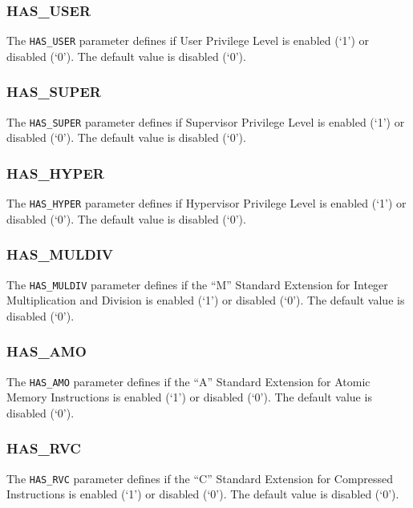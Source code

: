 \subsubsection{HAS\_USER}\label{has_user}

The \texttt{HAS\_USER} parameter defines if User Privilege Level is enabled (`1')
or disabled (`0'). The default value is disabled (`0').

\subsubsection{HAS\_SUPER}\label{has_super}

The \texttt{HAS\_SUPER} parameter defines if Supervisor Privilege Level is
enabled (`1') or disabled (`0'). The default value is disabled (`0').

\subsubsection{HAS\_HYPER}\label{has_hyper}

The \texttt{HAS\_HYPER} parameter defines if Hypervisor Privilege Level is
enabled (`1') or disabled (`0'). The default value is disabled (`0').

\subsubsection{HAS\_MULDIV}\label{has_muldiv}

The \texttt{HAS\_MULDIV} parameter defines if the ``M'' Standard Extension for
Integer Multiplication and Division is enabled (`1') or disabled (`0').
The default value is disabled (`0').

\subsubsection{HAS\_AMO}\label{has_amo}

The \texttt{HAS\_AMO} parameter defines if the ``A'' Standard Extension for
Atomic Memory Instructions is enabled (`1') or disabled (`0'). The
default value is disabled (`0').

\subsubsection{HAS\_RVC}\label{has_rvc}

The \texttt{HAS\_RVC} parameter defines if the ``C'' Standard Extension for
Compressed Instructions is enabled (`1') or disabled (`0'). The default
value is disabled (`0').

